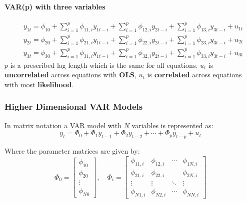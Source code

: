 \documentclass[11pt]{article}
\begin{document}
\paragraph{VAR(p) with three variables}
\begin{equation}
\begin{aligned}
& y_{1 t}=\phi_{10}+\sum_{i=1}^p \phi_{11, i} y_{1 t-i}+\sum_{i=1}^p \phi_{12, i} y_{2 t-i}+\sum_{i=1}^p \phi_{13, i} y_{3 t-i}+u_{1 t} \\
& y_{2 t}=\phi_{20}+\sum_{i=1}^p \phi_{21, i} y_{1 t-i}+\sum_{i=1}^p \phi_{22, i} y_{2 t-i}+\sum_{i=1}^p \phi_{23, i} y_{3 t-i}+u_{2 t} \\
& y_{3 t}=\phi_{30}+\sum_{i=1}^p \phi_{31, i} y_{1 t-i}+\sum_{i=1}^p \phi_{32, i} y_{2 t-i}+\sum_{i=1}^p \phi_{33, i} y_{3 t-i}+u_{3 t}
\end{aligned}
\end{equation}
$p$ is a prescribed lag length which is the same for all equations. $u_t$ is \textbf{uncorrelated} across equations with \textbf{OLS}, $u_t$ is \textbf{correlated} across equations with most \textbf{likelihood}.


\subsubsection{Higher Dimensional VAR Models}

In matrix notation a VAR model with $N$ variables is represented as:
\begin{equation}
y_t=\Phi_0+\Phi_1 y_{t-1}+\Phi_2 y_{t-2}+\cdots+\Phi_p y_{t-p}+u_t
\end{equation}

Where the parameter matrices are given by:
\begin{equation}
\Phi_0=\left[\begin{array}{c}
\phi_{10} \\
\phi_{20} \\
\vdots \\
\phi_{N 0}
\end{array}\right], \quad \Phi_i=\left[\begin{array}{cccc}
\phi_{11, i} & \phi_{12, i} & \cdots & \phi_{1 N, i} \\
\phi_{21, i} & \phi_{22, i} & & \phi_{2 N, i} \\
\vdots & \vdots & \ddots & \vdots \\
\phi_{N 1, i} & \phi_{N 2, i} & \cdots & \phi_{N N, i}
\end{array}\right]
\end{equation}
\end{document}

